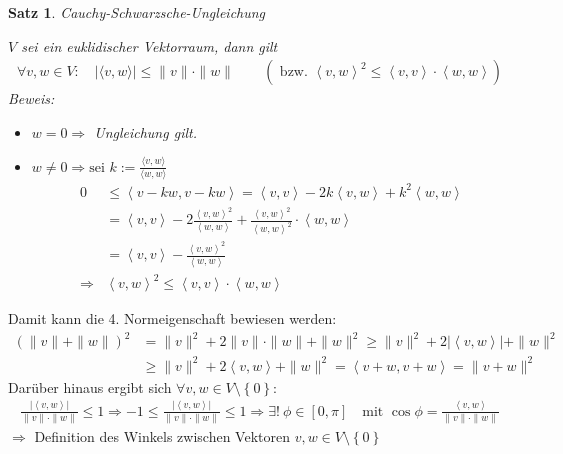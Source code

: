 \documentclass[%
a4paper,
11pt,		%
]
{scrartcl}
\theoremstyle{plain}
\theoremstyle{plain}
\newtheorem{mysatz}[mydef]{Satz}
\theoremstyle{plain}
\theoremstyle{plain}
\theoremstyle{plain}
\begin{document}
\begin{mysatz}
    Cauchy-Schwarzsche-Ungleichung

    $V$ sei ein euklidischer Vektorraum, dann gilt
    \begin{align*}
        \forall v,w \in V: \quad \left| \langle v,w \rangle \right| \leq \| v \| \cdot \| w \| \qquad \left( \text{ bzw. } {\left\langle v,w \right\rangle}^2 \leq \left\langle v,v \right\rangle \cdot \left\langle w,w \right\rangle \right)
    \end{align*}
    \textit{Beweis:}
    \begin{itemize}
        \item $w=0 \Rightarrow$ Ungleichung gilt.
        \item $w \neq 0 \Rightarrow \text{sei } k := \frac{\langle v,w \rangle}{\langle w,w \rangle}$
            \begin{align*}
                0 & \leq \left\langle v-kw, v-kw \right\rangle = \left\langle v,v \right\rangle -2k \left\langle v,w \right\rangle +k^2 \left\langle w,w \right\rangle\\
                & = \left\langle v,v \right\rangle -2 \frac{ \left\langle v,w \right\rangle^2 }{\left\langle w,w \right\rangle } + \frac{ \left\langle v,w \right\rangle^2 }{\left\langle w,w \right\rangle^2} \cdot \left\langle w,w \right\rangle\\
                & = \left\langle v,v \right\rangle - \frac{ \left\langle v,w \right\rangle^2 }{ \left\langle w,w \right\rangle }\\
                \Rightarrow & \left\langle v,w \right\rangle^2 \leq \left\langle v,v \right\rangle \cdot \left\langle w,w \right\rangle 
            \end{align*}
    \end{itemize}
\end{mysatz}
Damit kann die 4. Normeigenschaft bewiesen werden:
\begin{align*}
    \left( \| v \| + \| w \| \right)^2 & = \| v \|^2 +2 \| v \| \cdot \| w \| + \| w \|^2 \geq \| v \|^2 + 2 \left| \left\langle v,w \right\rangle  \right| + \| w \|^2\\
    & \geq \| v \|^2 + 2 \left\langle v,w \right\rangle + \| w \|^2 = \left\langle v+w,v+w \right\rangle = \| v+w \|^2
\end{align*}
Darüber hinaus ergibt sich $\forall v,w \in V\setminus\left\{ 0 \right\}:$
\begin{align*}
    \frac{| \left\langle v,w \right\rangle |}{\|v\| \cdot \|w\|} \leq 1 \Rightarrow -1 \leq \frac{| \left\langle v,w \right\rangle |}{\|v\| \cdot \|w\|} \leq 1 \Rightarrow \exists!\ \phi \in \left[ 0, \pi \right] \quad \text{mit } \cos \phi = \frac{\left\langle v,w \right\rangle}{\|v\| \cdot \|w\|}
\end{align*}
$\Rightarrow$ Definition des Winkels zwischen Vektoren $v,w \in V\setminus\left\{ 0 \right\}$
\end{document}
